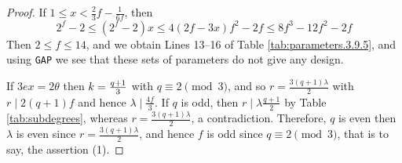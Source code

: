 \documentclass[a4paper,twopage,reqno,12pt]{amsart}
\theoremstyle{definition}
\numberwithin{equation}{section}
\renewcommand{\leq}{\leqslant}
\begin{document}
\begin{proof}
If $1 \leq x<\frac{2}{3}f-\frac{1}{6f}$, then%
\begin{equation*}
2^{f}-2 \leq \left(2^{f}-2\right) x \leq 4(2f-3x)
f^{2}-2f \leq 8f^{3}-12f^{2}-2f
\end{equation*}
Then $2\leq f \leq 14$, and we obtain Lines 13--16 of Table \ref{tab:parameters.3.9.5}, and using \texttt{GAP} we see that these sets of parameters do not give any design.


If $3ex=2\theta $ then $k=\frac{q+1}{%
3}$ with $q\equiv 2 \pmod{3}$, and so $r=\frac{3(q+1)\lambda }{2}$ with $r\mid 2(q+1)f$ and
hence $\lambda \mid \frac{4f}{3}$. If $q$ is odd, then $r\mid \lambda \frac{q+1}{2}$ by Table \ref{tab:subdegrees}, whereas $r=\frac{3(q+1)\lambda }{2}$, a contradiction. Therefore, $q$ is even then $\lambda$ is even since $r=\frac{3(q+1)\lambda }{2}$, and hence $f$ is odd since $q\equiv 2 \pmod{3}$, that is to say, the assertion (1).

\end{proof}
\end{document}
